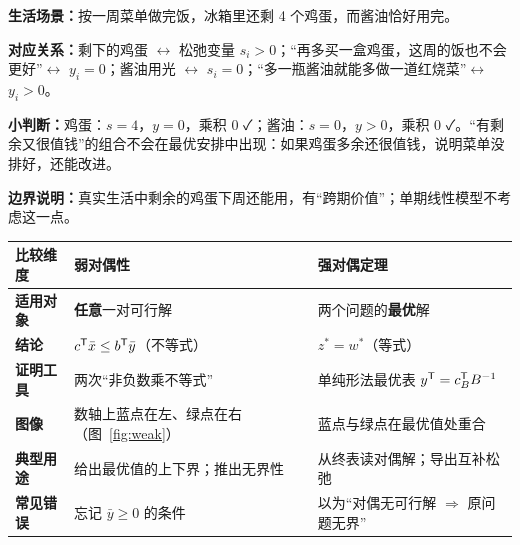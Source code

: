 \begin{lifebox}[冰箱里剩下的鸡蛋与用光的酱油]
\begin{minipage}[t]{0.56\linewidth}
\textbf{生活场景：}按一周菜单做完饭，冰箱里还剩 4 个鸡蛋，而酱油恰好用完。\par
\textbf{对应关系：}剩下的鸡蛋 $\leftrightarrow$ 松弛变量 $s_i>0$；“再多买一盒鸡蛋，这周的饭也不会更好”$\leftrightarrow$ $y_i=0$；酱油用光 $\leftrightarrow$ $s_i=0$；“多一瓶酱油就能多做一道红烧菜”$\leftrightarrow$ $y_i>0$。\par
\textbf{小判断：}鸡蛋：$s=4$，$y=0$，乘积 0 ✓；酱油：$s=0$，$y>0$，乘积 0 ✓。“有剩余又很值钱”的组合不会在最优安排中出现：如果鸡蛋多余还很值钱，说明菜单没排好，还能改进。\par
\textbf{边界说明：}真实生活中剩余的鸡蛋下周还能用，有“跨期价值”；单期线性模型不考虑这一点。
\end{minipage}\hfill
\begin{minipage}[t]{0.40\linewidth}\vspace{0pt}\centering
{}
\end{minipage}
\end{lifebox}

\begin{table}[!htbp]\centering
\small
\begin{tabularx}{\linewidth}{@{}>{\bfseries}lXX@{}}
\toprule
\rowcolor{lightblue}比较维度 & 弱对偶性 & 强对偶定理\\\midrule
适用对象 & \textbf{任意}一对可行解 & 两个问题的\textbf{最优}解\\
结论 & $c^{\mathsf T}\bar x\le b^{\mathsf T}\bar y$（不等式） & $z^*=w^*$（等式）\\
证明工具 & 两次“非负数乘不等式” & 单纯形法最优表 $y^{\mathsf T}=c_B^{\mathsf T} B^{-1}$\\
图像 & 数轴上蓝点在左、绿点在右（图~\ref{fig:weak}） & 蓝点与绿点在最优值处重合\\
典型用途 & 给出最优值的上下界；推出无界性 & 从终表读对偶解；导出互补松弛\\
常见错误 & 忘记 $\bar y\ge0$ 的条件 & 以为“对偶无可行解 $\Rightarrow$ 原问题无界”\\
\bottomrule
\end{tabularx}\par\nopagebreak[4]
\end{table}

